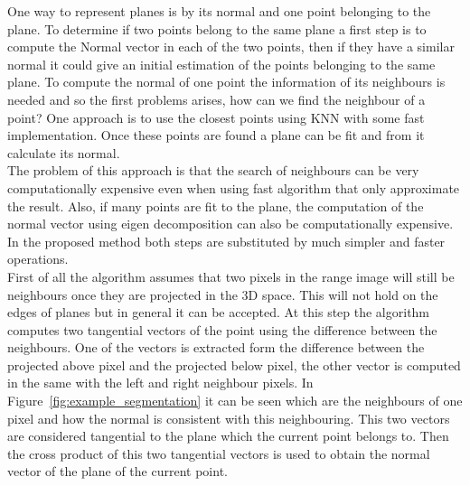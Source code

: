 \documentclass[fontsize=12pt]{article}
\begin{document}
One way to represent planes is by its normal and one point belonging to the plane. To determine if two points belong to the same plane a first step is to compute the Normal vector in each of the two points, then if they have a similar normal it could give an initial estimation of the points belonging to the same plane.  To compute the normal of one point the information of its neighbours is needed and so  the first problems arises, how can we find the neighbour of a point? One approach is to use the closest points using KNN with some fast implementation. Once these points are found a plane can be fit and from it calculate its normal.\\

The problem of this approach is that the search of neighbours can be very computationally expensive even when using fast algorithm that only approximate the result. Also, if many points are fit to the plane, the computation of the normal vector using eigen decomposition can also be computationally expensive. \\

In the proposed method both steps are substituted by much simpler and faster operations.\\

First of all the algorithm assumes that two pixels in the range image will still be neighbours once they are projected in the 3D space. This will not hold on the edges of planes but in general it can be accepted. At this step the algorithm computes two tangential vectors of the point using the difference between the neighbours. One of the vectors is extracted form the difference between the projected above pixel and the projected below pixel, the other vector is computed in the same with the left and right neighbour pixels. In Figure~\ref{fig:example_segmentation} it can be seen which are the neighbours of one pixel and how the normal is consistent with this neighbouring. This two vectors are considered tangential to the plane which the current point belongs to. Then the cross product of this two tangential vectors is used to obtain the normal vector of the plane of the current point.\\
\end{document}
